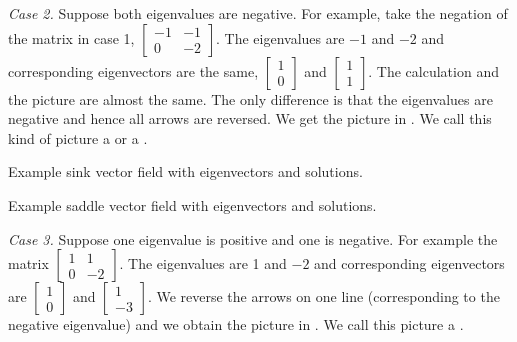 \emph{Case 2.} Suppose both eigenvalues are negative.  For example, take
the
negation of the matrix in case 1,
$\left[ \begin{smallmatrix} -1 & -1 \\ 0 & -2 \end{smallmatrix} \right]$.
The eigenvalues are $-1$ and $-2$ and corresponding eigenvectors are
the same,
$\left[ \begin{smallmatrix} 1 \\ 0 \end{smallmatrix} \right]$ and
$\left[ \begin{smallmatrix} 1 \\ 1 \end{smallmatrix} \right]$.  The
calculation and the picture are almost the same.  The only difference is that
the eigenvalues are negative and hence all arrows are reversed.  We get the
picture in .  We call this kind of picture a
\emph{} or a \emph{}.

\begin{myfig}
\parbox[t]{3.0in}{
 \capstart
 \caption{Example sink vector field with eigenvectors and
 solutions.\label{pln:sink-fullfig}}
}
\quad
\parbox[t]{3.0in}{
 \capstart
 \caption{Example saddle vector field with eigenvectors and
 solutions.\label{pln:saddle-fullfig}}
}
\end{myfig}

\medskip

\emph{Case 3.} Suppose one eigenvalue is positive and one is negative.
For example the matrix
$\left[ \begin{smallmatrix} 1 & 1 \\ 0 & -2 \end{smallmatrix} \right]$.
The eigenvalues are 1 and $-2$ and corresponding eigenvectors are
$\left[ \begin{smallmatrix} 1 \\ 0 \end{smallmatrix} \right]$ and
$\left[ \begin{smallmatrix} 1 \\ -3 \end{smallmatrix} \right]$.  We reverse
the arrows on one line (corresponding to the negative eigenvalue) and we
obtain the picture in .  We call this picture a
\emph{}.

